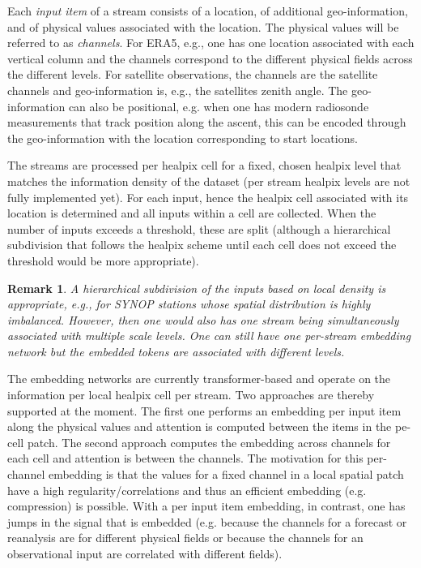 \documentclass{article}
\newtheorem{remark}{Remark}
\begin{document}
Each \emph{input item} of a stream consists of a location, of additional geo-information, and of physical values associated with the location.
The physical values will be referred to as \emph{channels}.
For ERA5, e.g., one has one location associated with each vertical column and the channels correspond to the different physical fields across the different levels. 
For satellite observations, the channels are the satellite channels and geo-information is, e.g., the satellites zenith angle.
The geo-information can also be positional, e.g. when one has modern radiosonde measurements that track position along the ascent, this can be encoded through the geo-information with the location corresponding to start locations.

The streams are processed per healpix cell for a fixed, chosen healpix level that matches the information density of the dataset (per stream healpix levels are not fully implemented yet).
For each input, hence the healpix cell associated with its location is determined and all inputs within a cell are collected.
When the number of inputs exceeds a threshold, these are split (although a hierarchical subdivision that follows the healpix scheme until each cell does not exceed the threshold would be more appropriate). 

\begin{remark}
  A hierarchical subdivision of the inputs based on local density is appropriate, e.g., for SYNOP stations whose spatial distribution is highly imbalanced.
  However, then one would also has one stream being simultaneously associated with multiple scale levels. 
  One can still have one per-stream embedding network but the embedded tokens are associated with different levels.
\end{remark}

The embedding networks are currently transformer-based and operate on the information per local healpix cell per stream.
Two approaches are thereby supported at the moment. 
The first one performs an embedding per input item along the physical values and attention is computed  between the items in the pe-cell patch.
The second approach computes the embedding across channels for each cell and attention is between the channels. 
The motivation for this per-channel embedding is that the values for a fixed channel in a local spatial patch have a high regularity/correlations and thus an efficient embedding (e.g. compression) is possible. 
With a per input item embedding, in contrast, one has jumps in the signal that is embedded (e.g. because the channels for a forecast or reanalysis are for different physical fields or because the channels for an observational input are correlated with different fields). 
\end{document}
